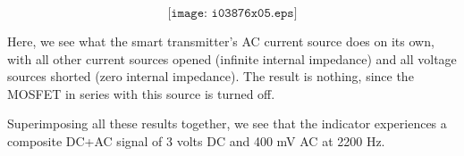 $$\texttt{[image: i03876x05.eps]}$$

Here, we see what the smart transmitter's AC current source does on its own, with all other current sources opened (infinite internal impedance) and all voltage sources shorted (zero internal impedance).  The result is nothing, since the MOSFET in series with this source is turned off.

\vskip 10pt

Superimposing all these results together, we see that the indicator experiences a composite DC+AC signal of 3 volts DC and 400 mV AC at 2200 Hz.




